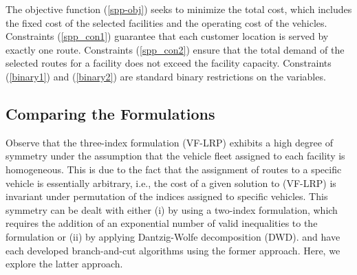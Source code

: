 The objective function (\ref{spp-obj}) seeks to minimize the total
cost, which includes the fixed cost of the selected facilities and the
operating cost of the vehicles. Constraints (\ref{spp_con1}) guarantee
that each customer location is served by exactly one route.
Constraints (\ref{spp_con2}) ensure that the total demand of the
selected routes for a facility does not exceed the facility capacity.
Constraints (\ref{binary1}) and (\ref{binary2}) are standard
binary restrictions on the variables.

\subsection{Comparing the Formulations}
Observe that the three-index formulation (VF-LRP) exhibits a high
degree of symmetry under the assumption that the vehicle fleet
assigned to each facility is homogeneous. This is due to the fact that
the assignment of routes to a specific vehicle is essentially arbitrary,
i.e., the cost of a given solution to (VF-LRP) is invariant under
permutation of the indices assigned to specific vehicles. This
symmetry can be dealt with either (i) by using a two-index
formulation, which requires the addition of an exponential number of
valid inequalities to the formulation or (ii) by applying
Dantzig-Wolfe decomposition (DWD). \citet{Laporte86} and
\citet{Belenguer} have each developed branch-and-cut algorithms using
the former approach. Here, we explore the latter approach.

